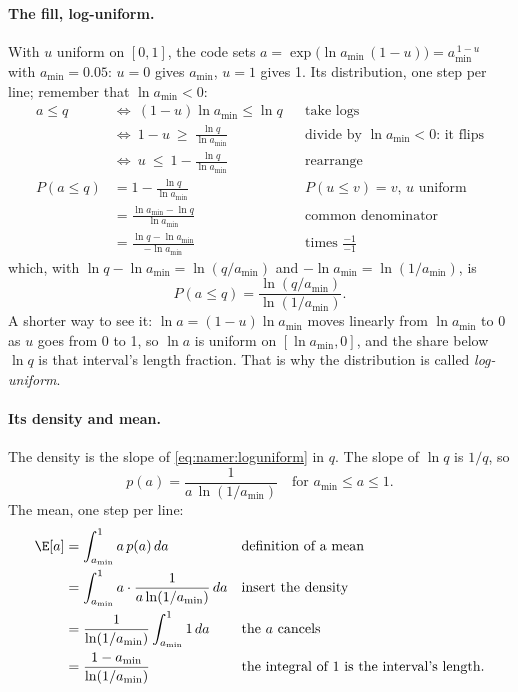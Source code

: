 \paragraph{The fill, log-uniform.} With $u$ uniform on $[0,1]$, the code sets
$a=\exp\big(\ln a_{\min}\,(1-u)\big)=a_{\min}^{\,1-u}$ with $a_{\min}=0.05$: $u=0$ gives $a_{\min}$, $u=1$ gives 1.
Its distribution, one step per line; remember that $\ln a_{\min}<0$:
\begin{align*}
a\le q\ &\Longleftrightarrow\ (1-u)\ln a_{\min}\le\ln q &&\text{take logs}\\
&\Longleftrightarrow\ 1-u\ \ge\ \frac{\ln q}{\ln a_{\min}} &&\text{divide by $\ln a_{\min}<0$: it flips}\\
&\Longleftrightarrow\ u\ \le\ 1-\frac{\ln q}{\ln a_{\min}} &&\text{rearrange}\\
P(a\le q) &= 1-\frac{\ln q}{\ln a_{\min}} &&\text{$P(u\le v)=v$, $u$ uniform}\\
&= \frac{\ln a_{\min}-\ln q}{\ln a_{\min}} &&\text{common denominator}\\
&= \frac{\ln q-\ln a_{\min}}{-\ln a_{\min}} &&\text{times }\tfrac{-1}{-1}
\end{align*}
which, with $\ln q-\ln a_{\min}=\ln(q/a_{\min})$ and $-\ln a_{\min}=\ln(1/a_{\min})$, is
\begin{equation}
P(a\le q)=\frac{\ln(q/a_{\min})}{\ln(1/a_{\min})} .
\label{eq:namer:loguniform}
\end{equation}
A shorter way to see it: $\ln a=(1-u)\ln a_{\min}$ moves linearly from $\ln a_{\min}$ to 0 as $u$ goes from 0 to 1,
so $\ln a$ is uniform on $[\ln a_{\min},0]$, and the share below $\ln q$ is that interval's length fraction. That is
why the distribution is called \emph{log-uniform}.

\paragraph{Its density and mean.} The density is the slope of \cref{eq:namer:loguniform} in $q$. The slope of
$\ln q$ is $1/q$, so
\begin{equation}
p(a)=\frac{1}{a\,\ln(1/a_{\min})}\quad\text{for }a_{\min}\le a\le1 .
\end{equation}
The mean, one step per line:
\begin{align*}
\E[a] &= \int_{a_{\min}}^{1} a\,p(a)\,da &&\text{definition of a mean}\\
&= \int_{a_{\min}}^{1} a\cdot\frac{1}{a\ln(1/a_{\min})}\,da &&\text{insert the density}\\
&= \frac{1}{\ln(1/a_{\min})}\int_{a_{\min}}^{1} 1\,da &&\text{the $a$ cancels}\\
&= \frac{1-a_{\min}}{\ln(1/a_{\min})} &&\text{the integral of 1 is the interval's length.}
\end{align*}


